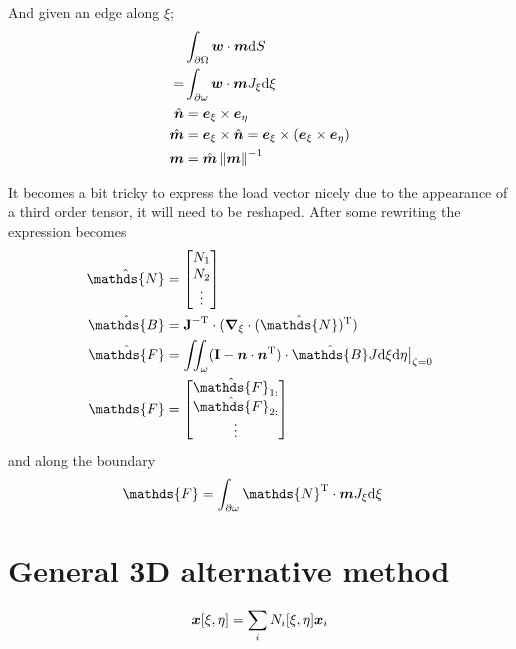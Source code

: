\documentclass[a4paper,11pt]{article}
\renewcommand{\to}[1]{\text{\boldmath $#1$}} %
\newcommand{\ts}[1]{\text{\boldmath $\mathrm{#1}$}} %
\newcommand{\uv}[1]{\mathds{#1}}
\newcommand{\um}[1]{\mathds{#1}}
\newcommand{\intd}[1]{\mathrm{d}#1}
\newcommand{\norm}[1]{\left\lVert{#1}\right\rVert}
\newcommand{\T}{\mathrm{T}}
\begin{document}
And given an edge along $\xi$;
\begin{align}
 &\int_{\partial\Omega}\to w\cdot\to m\intd S\\
=&\int_{\partial\omega}\to w\cdot\to m J_\xi \intd \xi\\
 \hat{\to n} &= \to e_\xi \times \to e_\eta\\
 \hat{\to m} &= \to e_\xi \times \hat{\to n} = \to e_\xi\times (\to e_\xi \times \to e_\eta)\\
 \to m &= \hat{\to m}\norm{\to m}^{-1}
\end{align}

It becomes a bit tricky to express the load vector nicely due to the appearance of a third order tensor, it will need to be reshaped.
After some rewriting the expression becomes
\begin{align}
 \hat{\uv N} &= \begin{bmatrix} N_1\\ N_2\\ \vdots\end{bmatrix}\\
 \hat{\um B} &= \ts J^{-\T}\cdot(\to\nabla_\xi\cdot(\hat{\uv N})^\T)\\
 \hat{\um F} &= \iint_\omega(\ts I-\to n \cdot \to n^\T)\cdot \hat{\um B} J\intd\xi\intd\eta\big|_{\zeta=0}\\
 \uv F &= \begin{bmatrix}\hat{\uv F}_{1:}\\\hat{\uv F}_{2:}\\\vdots\end{bmatrix}
\end{align}
and along the boundary
\begin{align}
 \uv F &= \int_{\partial\omega}{\um N}^\T\cdot\to m J_\xi \intd \xi
\end{align}


\section{General 3D alternative method}
\begin{align}
 \to x[\xi,\eta] = \sum_i N_i[\xi,\eta]\to x_i
\end{align}
\end{document}
